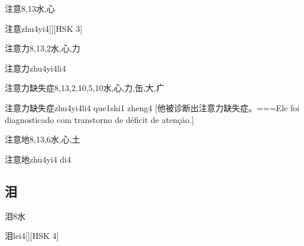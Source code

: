 \begin{Entry}{注意}{8,13}{⽔,⼼}
  \begin{Phonetics}{注意}{zhu4yi4}[][HSK 3]
  \end{Phonetics}
\end{Entry}

\begin{Entry}{注意力}{8,13,2}{⽔,⼼,⼒}
  \begin{Phonetics}{注意力}{zhu4yi4li4}
  \end{Phonetics}
\end{Entry}

\begin{Entry}{注意力缺失症}{8,13,2,10,5,10}{⽔,⼼,⼒,⽸,⼤,⽧}
  \begin{Phonetics}{注意力缺失症}{zhu4yi4li4 que1shi1 zheng4}
    [他被诊断出注意力缺失症。===Ele foi diagnosticado com transtorno de déficit de atenção.]
  \end{Phonetics}
\end{Entry}

\begin{Entry}{注意地}{8,13,6}{⽔,⼼,⼟}
  \begin{Phonetics}{注意地}{zhu4yi4 di4}
  \end{Phonetics}
\end{Entry}

\subsection*{泪}

\begin{Entry}{泪}{8}{⽔}
  \begin{Phonetics}{泪}{lei4}[][HSK 4]
  \end{Phonetics}
\end{Entry}

